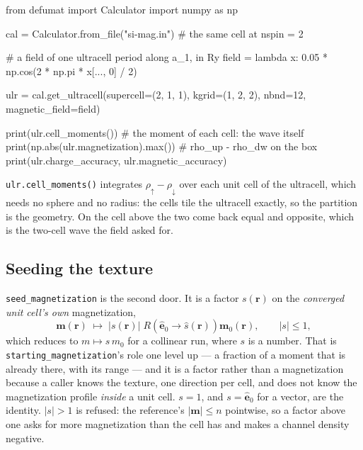 \documentclass[11pt,a4paper]{article}
\newcommand{\code}[1]{\texttt{\small #1}}
\begin{document}
\begin{pycode}
from defumat import Calculator
import numpy as np

cal = Calculator.from_file("si-mag.in")     # the same cell at nspin = 2

# a field of one ultracell period along a_1, in Ry
field = lambda x: 0.05 * np.cos(2 * np.pi * x[..., 0] / 2)

ulr = cal.get_ultracell(supercell=(2, 1, 1), kgrid=(1, 2, 2),
                        nbnd=12, magnetic_field=field)

print(ulr.cell_moments())          # the moment of each cell: the wave itself
print(np.abs(ulr.magnetization).max())         # rho_up - rho_dw on the box
print(ulr.charge_accuracy, ulr.magnetic_accuracy)
\end{pycode}

\code{ulr.cell\_moments()} integrates $\rho_\uparrow - \rho_\downarrow$ over
each unit cell of the ultracell, which needs no sphere and no radius: the cells
tile the ultracell exactly, so the partition is the geometry. On the cell above
the two come back equal and opposite, which is the two-cell wave the field asked
for.

\subsection*{Seeding the texture}

\code{seed\_magnetization} is the second door. It is a factor
$s(\mathbf r)$ on the \emph{converged unit cell's own} magnetization,
\begin{equation*}
  \mathbf m(\mathbf r) \;\longmapsto\;
  |s(\mathbf r)|\; R\!\left(\hat{\mathbf e}_0 \to \hat s(\mathbf r)\right)
  \mathbf m_0(\mathbf r),
  \qquad |s| \le 1,
\end{equation*}
which reduces to $m \mapsto s\,m_0$ for a collinear run, where $s$ is a number.
That is \code{starting\_magnetization}'s role one level up --- a fraction of a
moment that is already there, with its range --- and it is a factor rather than
a magnetization because a caller knows the texture, one direction per cell, and
does not know the magnetization profile \emph{inside} a unit cell. $s = 1$, and
$s = \hat{\mathbf e}_0$ for a vector, are the identity. $|s| > 1$ is refused: the
reference's $|\mathbf m| \le n$ pointwise, so a factor above one asks for more
magnetization than the cell has and makes a channel density negative.
\end{document}
